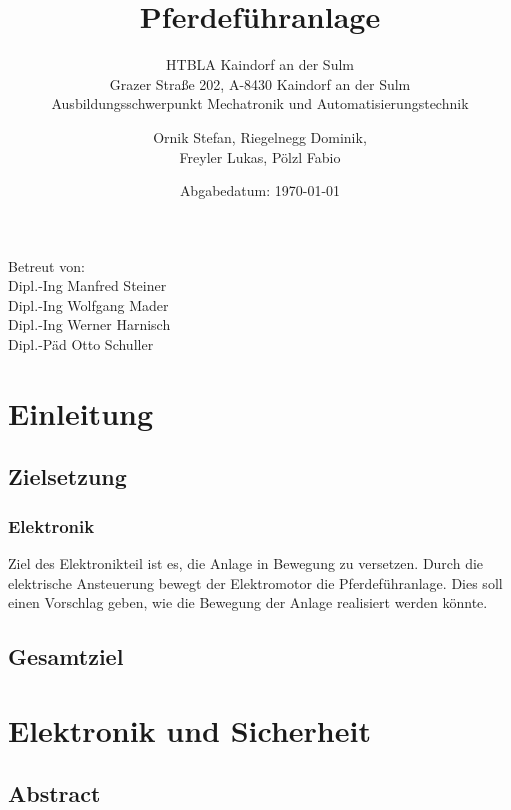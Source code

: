 \documentclass[12pt]{scrreprt} %
\title{Pferdeführanlage \\ }
\subtitle{HTBLA Kaindorf an der Sulm \\ Grazer Straße 202, A-8430 Kaindorf an der Sulm \\ Ausbildungsschwerpunkt Mechatronik und Automatisierungstechnik}
\author{Ornik Stefan, Riegelnegg Dominik, \\ Freyler Lukas, Pölzl Fabio}
\date{Abgabedatum: \today{}}
\begin{document}
\maketitle

\begin{center} 
Betreut von:\\Dipl.-Ing Manfred Steiner\\Dipl.-Ing Wolfgang Mader\\Dipl.-Ing Werner Harnisch\\Dipl.-Päd Otto Schuller
\end{center}


\tableofcontents

\listoffigures


\newpage
\chapter{Einleitung}
\label{sec:einleitung}

\section{Zielsetzung}
\label{sec:zielsetzung}

\subsection{Elektronik}
\label{sec:elektronik}

Ziel des Elektronikteil ist es, die Anlage in Bewegung zu versetzen. Durch die elektrische Ansteuerung bewegt der Elektromotor die Pferdeführanlage. Dies soll einen Vorschlag geben, wie die Bewegung der Anlage realisiert werden könnte. 

\section{Gesamtziel}
\label{sec:gesamtziel}

\chapter{Elektronik und Sicherheit}
\label{sec:elektronikUndSicherheit}

\section{Abstract}
\label{sec:abstract}
\end{document}
